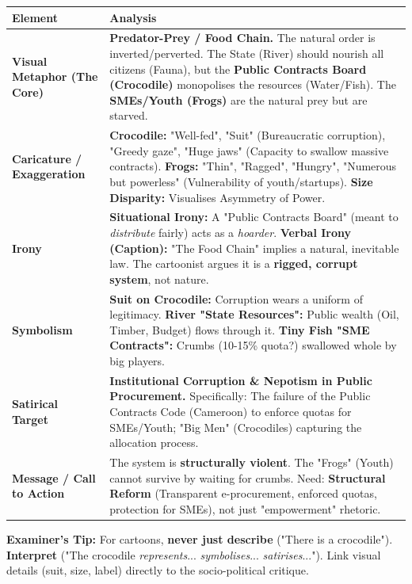 \documentclass[11pt]{article}
\newcommand{\cle}[1]{{\popxbold\color{popdark}#1}}
\begin{document}
\begin{exoresolu}
\begin{center}
\begin{tabularx}{\linewidth}{|l|X|}
\hline
\rowcolor{popblueL} \textbf{Element} & \textbf{Analysis} \\
\hline
\textbf{Visual Metaphor (The Core)} & \textbf{Predator-Prey / Food Chain.} The natural order is inverted/perverted. The State (River) should nourish all citizens (Fauna), but the \textbf{Public Contracts Board (Crocodile)} monopolises the resources (Water/Fish). The \textbf{SMEs/Youth (Frogs)} are the natural prey but are starved. \\
\hline
\textbf{Caricature / Exaggeration} & \textbf{Crocodile:} "Well-fed", "Suit" (Bureaucratic corruption), "Greedy gaze", "Huge jaws" (Capacity to swallow massive contracts). \textbf{Frogs:} "Thin", "Ragged", "Hungry", "Numerous but powerless" (Vulnerability of youth/startups). \textbf{Size Disparity:} Visualises \cle{Asymmetry of Power}. \\
\hline
\textbf{Irony} & \textbf{Situational Irony:} A "Public Contracts Board" (meant to \emph{distribute} fairly) acts as a \emph{hoarder}. \textbf{Verbal Irony (Caption):} "The Food Chain" implies a natural, inevitable law. The cartoonist argues it is a \textbf{rigged, corrupt system}, not nature. \\
\hline
\textbf{Symbolism} & \textbf{Suit on Crocodile:} Corruption wears a uniform of legitimacy. \textbf{River "State Resources":} Public wealth (Oil, Timber, Budget) flows through it. \textbf{Tiny Fish "SME Contracts":} Crumbs (10-15\% quota?) swallowed whole by big players. \\
\hline
\textbf{Satirical Target} & \textbf{Institutional Corruption \& Nepotism in Public Procurement.} Specifically: The failure of the \cle{Public Contracts Code} (Cameroon) to enforce quotas for SMEs/Youth; "Big Men" (Crocodiles) capturing the allocation process. \\
\hline
\textbf{Message / Call to Action} & The system is \textbf{structurally violent}. The "Frogs" (Youth) cannot survive by waiting for crumbs. Need: \textbf{Structural Reform} (Transparent e-procurement, enforced quotas, protection for SMEs), not just "empowerment" rhetoric. \\
\hline
\end{tabularx}
\end{center}

\textbf{Examiner's Tip:} For cartoons, \textbf{never just describe} ("There is a crocodile"). \textbf{Interpret} ("The crocodile \emph{represents}... \emph{symbolises}... \emph{satirises}..."). Link visual details (suit, size, label) directly to the \cle{socio-political critique}.
\end{exoresolu}
\end{document}
